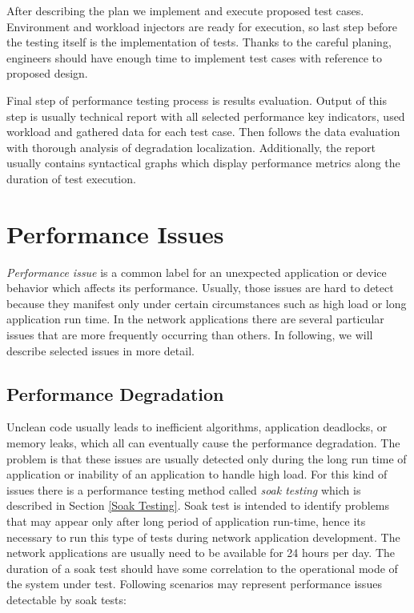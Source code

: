 After describing the plan we implement and execute proposed test cases. Environment and workload injectors are ready for execution, so last step before the testing itself is the implementation of tests. Thanks to the careful planing, engineers should have enough time to implement test cases with reference to proposed design. 

Final step of performance testing process is results evaluation. Output of this step is usually technical report with all selected performance key indicators, used workload and gathered data for each test case. Then follows the data evaluation with thorough analysis of degradation localization. Additionally, the report usually contains syntactical graphs which display performance metrics along the duration of test execution.

\section{Performance Issues}
\label{Performance Issues}
\emph{Performance issue} is a common label for an unexpected application or device behavior which affects its performance. Usually, those issues are hard to detect because they manifest only under certain circumstances such as high load or long application run time. In the network applications there are several particular issues that are more frequently occurring  than others. In following, we will describe selected issues in more detail.

\subsection*{Performance Degradation}
\label{Performance Degradation}
Unclean code usually leads to inefficient algorithms, application deadlocks, or memory leaks, which all can eventually cause the performance degradation. The problem is that these issues are usually detected only during the long run time of application or inability of an application to handle high load. For this kind of issues there is a performance testing method called \emph{soak testing} \cite{BUCH:4TYPES, Manzor:APTB} which is described in Section \ref{Soak Testing}. Soak test is intended to identify problems that may appear only after long period of application run-time, hence its necessary to run this type of tests during network application development. The network applications are usually need to be available for 24 hours per day. The duration of a soak test should have some correlation to the operational mode of the system under test. Following scenarios may represent performance issues detectable by soak tests:

